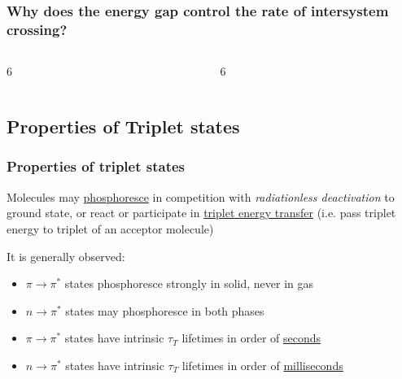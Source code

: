 \documentclass[a4paper,12pt,titlepage]{article}
\begin{document}
\begin{frame}
\frametitle{Why does the energy gap control the rate of intersystem crossing?}
\begin{columns}[onlytextwidth]
\begin{column}{6\TPHorizModule}
\end{column}
\begin{column}{6\TPHorizModule}
\end{column}
\end{columns}
\end{frame}

\subsection{Properties of Triplet states}

\begin{frame}
\frametitle{Properties of triplet states}
Molecules may \underline{phosphoresce} in competition with \emph{radiationless deactivation} to ground state, or react or participate in \underline{triplet energy transfer} (i.e. pass triplet energy to triplet of an acceptor molecule)\newline\medskip

It is generally observed:\newline
\begin{itemize}
\item \(\pi \rightarrow \pi^*\) states phosphoresce strongly in solid, never in gas
\item \(n \rightarrow \pi^*\) states may phosphoresce in both phases
\item \(\pi \rightarrow \pi^*\) states have intrinsic \(\tau_T\) lifetimes in order of \underline{seconds}
\item \(n \rightarrow \pi^*\) states have intrinsic \(\tau_T\) lifetimes in order of \underline{milliseconds}
\end{itemize}
\end{frame}
\end{document}
